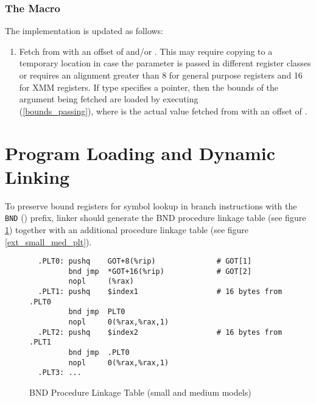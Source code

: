 \subsubsection{The  Macro}

The  implementation is updated as follows:

\begin{enumerate}
\item
  Fetch  from  with an offset of
   and/or .  This may require
  copying to a temporary location in case the parameter is passed in
  different register classes or requires an alignment greater than 8 for
  general purpose registers and 16 for XMM registers.  If type specifies
  a pointer, then the bounds of the argument being fetched are loaded
  by executing\\
  (\ref{bounds_passing}), where  is the actual value fetched from
   with an offset of .
\end{enumerate}

\section{Program Loading and Dynamic Linking}

To preserve bound registers for symbol lookup in branch instructions
with the \texttt{BND} () prefix, linker should generate the
BND procedure linkage table (see figure \ref{bnd_small_med_plt}) together
with an additional procedure linkage table (see figure
\ref{ext_small_med_plt}).

\begin{figure}[H]
\Hrule
\caption{BND Procedure Linkage Table (small and medium models)}
\label{bnd_small_med_plt}
\begin{footnotesize}
\begin{verbatim}
  .PLT0: pushq    GOT+8(%rip)              # GOT[1]
         bnd jmp  *GOT+16(%rip)            # GOT[2]
         nopl     (%rax)
  .PLT1: pushq    $index1                  # 16 bytes from .PLT0
         bnd jmp  PLT0
         nopl     0(%rax,%rax,1)
  .PLT2: pushq    $index2                  # 16 bytes from .PLT1
         bnd jmp  .PLT0
         nopl     0(%rax,%rax,1)
  .PLT3: ...
\end{verbatim}%
\end{footnotesize}
\Hrule
\end{figure}

